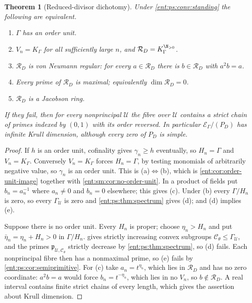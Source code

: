 \documentclass[11pt]{article}
\newtheorem{theorem}{Theorem}[section]
\theoremstyle{plain}
\theoremstyle{plain}
\theoremstyle{plain}
\theoremstyle{definition}
\theoremstyle{definition}
\theoremstyle{definition}
\theoremstyle{definition}
\theoremstyle{remark}
\newcommand{\RD}{\mathcal R_D}\newcommand{\Ucal}{\mathcal U}
\begin{document}
\begin{theorem}[Reduced-divisor dichotomy]\label{ent:ps:thm:dichotomy}
Under \cref{ent:ps:conv:standing} the following are equivalent.
\begin{enumerate}[label=\textnormal{(\alph*)},leftmargin=2em]
\item $\Gamma$ has an order unit.
\item $V_n=K_\Gamma$ for all sufficiently large $n$, and
$\RD=K_\Gamma^{\N_{>0}}$.
\item $\RD$ is von Neumann regular: for every $a\in\RD$ there is $b\in\RD$
with $a^2b=a$.
\item Every prime of $\RD$ is maximal; equivalently $\dim\RD=0$.
\item $\RD$ is a Jacobson ring.
\end{enumerate}
If they fail, then for every nonprincipal $\Ucal$ the fibre over $\Ucal$
contains a strict chain of primes indexed by $(0,1)$ with its order reversed.
In particular $\mathcal E_\Gamma/(P_D)$ has infinite Krull dimension,
although every zero of $P_D$ is simple.
\end{theorem}
\begin{proof}
If $h$ is an order unit, cofinality gives $\gamma_n\ge h$ eventually, so
$H_n=\Gamma$ and $V_n=K_\Gamma$. Conversely $V_n=K_\Gamma$ forces
$H_n=\Gamma$, by testing monomials of arbitrarily negative value, so
$\gamma_n$ is an order unit. This is (a)$\Leftrightarrow$(b), which is
\cref{ent:cor:order-unit-image} together with \cref{ent:sm:cor:no-order-unit}.
In a product of fields put $b_n=a_n^{-1}$ where $a_n\ne0$ and $b_n=0$
elsewhere; this gives (c). Under (b) every $\Gamma/H_n$ is zero, so every
$\Gamma_\Ucal$ is zero and \cref{ent:ps:thm:spectrum} gives (d); and (d)
implies (e).

Suppose there is no order unit. Every $H_n$ is proper; choose $\eta_n>H_n$
and put $\bar\eta_n=\eta_n+H_n>0$ in $\Gamma/H_n$.
 gives strictly increasing convex subgroups
$\mathcal C_\theta\le\Gamma_\Ucal$, and the primes $\mathfrak
p_{\Ucal,\mathcal C_\theta}$ strictly decrease by \cref{ent:ps:thm:spectrum},
so (d) fails. Each nonprincipal fibre then has a nonmaximal prime, so (e)
fails by \cref{ent:ps:cor:semiprimitive}. For (c) take $a_n=t^{\eta_n}$,
which lies in $\RD$ and has no zero coordinate: $a^2b=a$ would force
$b_n=t^{-\eta_n}$, which lies in no $V_n$, so $b\notin\RD$. A real interval
contains finite strict chains of every length, which gives the assertion
about Krull dimension.
\end{proof}
\end{document}
